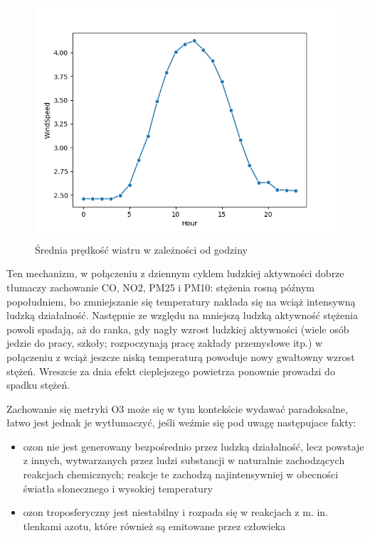 \documentclass[18pt, letterpaper]{article}
\begin{document}
\begin{figure}[H]
\centering
\includegraphics[width=120mm, height=90mm]{visualisations/weather_cycles/hourly_wind_speed.png}
\caption{Średnia prędkość wiatru w zależności od godziny}
\label{figure:wind_daily}
\end{figure}

Ten mechanizm, w połączeniu z dziennym cyklem ludzkiej aktywności dobrze tłumaczy zachowanie CO, NO2, PM25 i PM10: stężenia rosną późnym popołudniem, bo zmniejszanie się temperatury nakłada się na wciąż intensywną ludzką działalność. Następnie ze względu na mniejszą ludzką aktywność stężenia powoli spadają, aż do ranka, gdy nagły wzrost ludzkiej aktywności (wiele osób jedzie do pracy, szkoły; rozpoczynają pracę zakłady przemysłowe itp.) w połączeniu z wciąż jeszcze niską temperaturą powoduje nowy gwałtowny wzrost stężeń. Wreszcie za dnia efekt cieplejszego powietrza ponownie prowadzi do spadku stężeń.

Zachowanie się metryki O3 może się w tym kontekście wydawać paradoksalne, łatwo jest jednak je wytłumaczyć, jeśli weźmie się pod uwagę następujace fakty: 

\begin{itemize}
\item ozon nie jest generowany bezpośrednio przez ludzką działalność, lecz powstaje z innych, wytwarzanych przez ludzi substancji w naturalnie zachodzących reakcjach chemicznych; reakcje te zachodzą najintensywniej w obecności światła słonecznego i wysokiej temperatury
\item ozon troposferyczny jest niestabilny i rozpada się w reakcjach z m. in. tlenkami azotu, które również są emitowane przez człowieka
\end{itemize}
\end{document}
